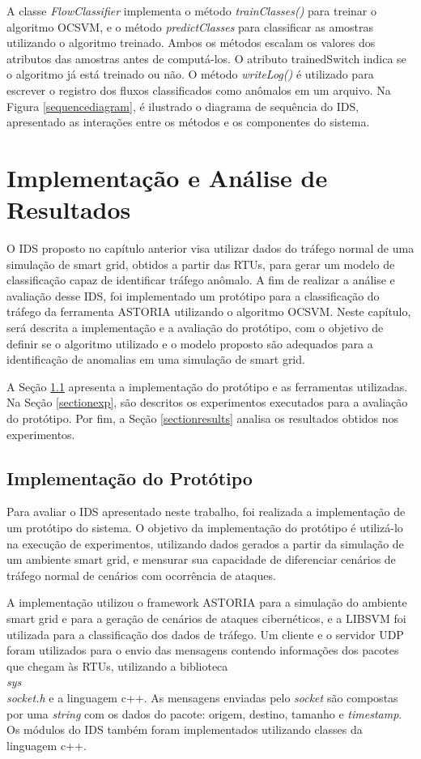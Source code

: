\documentclass[cic,tc]{iiufrgs}
\begin{document}
A classe \emph{FlowClassifier} implementa o método \emph{trainClasses()} para  treinar o algoritmo OCSVM, e o método \emph{predictClasses} para classificar as amostras utilizando o algoritmo treinado. Ambos os métodos escalam os valores dos atributos das amostras antes de computá-los. O atributo trainedSwitch indica se o algoritmo já está treinado ou não. O método \emph{writeLog()} é utilizado para escrever o registro dos fluxos classificados como anômalos em um arquivo. Na Figura \ref{sequencediagram}, é ilustrado o diagrama de sequência do IDS, apresentado as interações entre os métodos e os componentes do sistema.

\chapter{Implementação e Análise de Resultados}
O IDS proposto no capítulo anterior visa utilizar dados do tráfego normal de uma simulação de smart grid, obtidos a partir das RTUs, para gerar um modelo de classificação capaz de identificar tráfego anômalo. A fim de realizar a análise e avaliação desse IDS, foi implementado um protótipo para a classificação do tráfego da ferramenta ASTORIA utilizando o algoritmo OCSVM. Neste capítulo, será descrita a implementação e a avaliação do protótipo, com o objetivo de definir se o algoritmo utilizado e o modelo proposto são adequados para a identificação de anomalias em uma simulação de smart grid.

A Seção \ref{prototype} apresenta a implementação do protótipo e as ferramentas utilizadas. Na Seção \ref{sectionexp}, são descritos os experimentos executados para a avaliação do protótipo. Por fim, a Seção \ref{sectionresults} analisa os resultados obtidos nos experimentos.

\section{Implementação do Protótipo}
\label{prototype}
Para avaliar o IDS apresentado neste trabalho, foi realizada a implementação de um protótipo do sistema. O objetivo da implementação do protótipo é utilizá-lo na execução de experimentos, utilizando dados gerados a partir da simulação de um ambiente smart grid, e mensurar sua capacidade de diferenciar cenários de tráfego normal de cenários com ocorrência de ataques. 

A implementação utilizou o framework ASTORIA para a simulação do ambiente smart grid e para a geração de cenários de ataques cibernéticos, e a LIBSVM foi utilizada para a classificação dos dados de tráfego. Um cliente e o servidor UDP foram utilizados para o envio das mensagens contendo informações dos pacotes que chegam às RTUs, utilizando a biblioteca \emph{\\sys\\socket.h} e a linguagem c++. As mensagens enviadas pelo \emph{socket} são compostas por uma \emph{string} com os dados do pacote: origem, destino, tamanho e \emph{timestamp}. Os módulos do IDS também foram implementados utilizando classes da linguagem c++.
\end{document}
